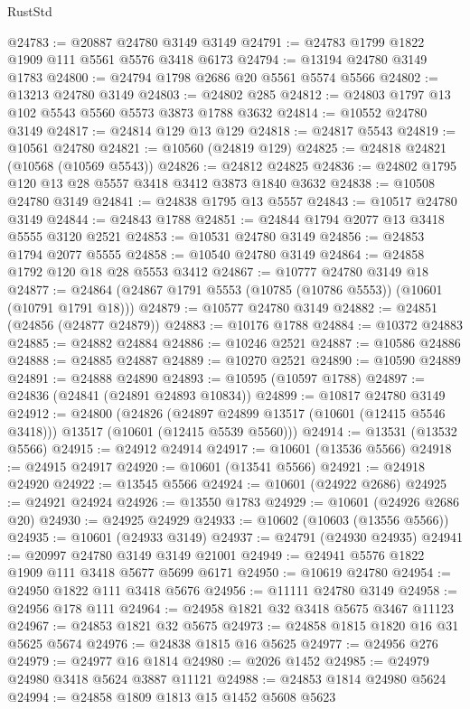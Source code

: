 \begin{lexlean}{RustStd}
\begin{coremodule}
@24783 := @20887 @24780 @3149 @3149
@24791 := @24783 @1799 @1822 @1909 @111 @5561 @5576 @3418 @6173
@24794 := @13194 @24780 @3149 @1783
@24800 := @24794 @1798 @2686 @20 @5561 @5574 @5566
@24802 := @13213 @24780 @3149
@24803 := @24802 @285
@24812 := @24803 @1797 @13 @102 @5543 @5560 @5573 @3873 @1788 @3632
@24814 := @10552 @24780 @3149
@24817 := @24814 @129 @13 @129
@24818 := @24817 @5543
@24819 := @10561 @24780
@24821 := @10560 (@24819 @129)
@24825 := @24818 @24821 (@10568 (@10569 @5543))
@24826 := @24812 @24825
@24836 := @24802 @1795 @120 @13 @28 @5557 @3418 @3412 @3873 @1840 @3632
@24838 := @10508 @24780 @3149
@24841 := @24838 @1795 @13 @5557
@24843 := @10517 @24780 @3149
@24844 := @24843 @1788
@24851 := @24844 @1794 @2077 @13 @3418 @5555 @3120 @2521
@24853 := @10531 @24780 @3149
@24856 := @24853 @1794 @2077 @5555
@24858 := @10540 @24780 @3149
@24864 := @24858 @1792 @120 @18 @28 @5553 @3412
@24867 := @10777 @24780 @3149 @18
@24877 := @24864 (@24867 @1791 @5553 (@10785 (@10786 @5553)) (@10601 (@10791 @1791 @18)))
@24879 := @10577 @24780 @3149
@24882 := @24851 (@24856 (@24877 @24879))
@24883 := @10176 @1788
@24884 := @10372 @24883
@24885 := @24882 @24884
@24886 := @10246 @2521
@24887 := @10586 @24886
@24888 := @24885 @24887
@24889 := @10270 @2521
@24890 := @10590 @24889
@24891 := @24888 @24890
@24893 := @10595 (@10597 @1788)
@24897 := @24836 (@24841 (@24891 @24893 @10834))
@24899 := @10817 @24780 @3149
@24912 := @24800
    (@24826
      (@24897 @24899 @13517 (@10601 (@12415 @5546 @3418)))
      @13517
      (@10601 (@12415 @5539 @5560)))
@24914 := @13531 (@13532 @5566)
@24915 := @24912 @24914
@24917 := @10601 (@13536 @5566)
@24918 := @24915 @24917
@24920 := @10601 (@13541 @5566)
@24921 := @24918 @24920
@24922 := @13545 @5566
@24924 := @10601 (@24922 @2686)
@24925 := @24921 @24924
@24926 := @13550 @1783
@24929 := @10601 (@24926 @2686 @20)
@24930 := @24925 @24929
@24933 := @10602 (@10603 (@13556 @5566))
@24935 := @10601 (@24933 @3149)
@24937 := @24791 (@24930 @24935)
@24941 := @20997 @24780 @3149 @3149 @21001
@24949 := @24941 @5576 @1822 @1909 @111 @3418 @5677 @5699 @6171
@24950 := @10619 @24780
@24954 := @24950 @1822 @111 @3418 @5676
@24956 := @11111 @24780 @3149
@24958 := @24956 @178 @111
@24964 := @24958 @1821 @32 @3418 @5675 @3467 @11123
@24967 := @24853 @1821 @32 @5675
@24973 := @24858 @1815 @1820 @16 @31 @5625 @5674
@24976 := @24838 @1815 @16 @5625
@24977 := @24956 @276
@24979 := @24977 @16 @1814
@24980 := @2026 @1452
@24985 := @24979 @24980 @3418 @5624 @3887 @11121
@24988 := @24853 @1814 @24980 @5624
@24994 := @24858 @1809 @1813 @15 @1452 @5608 @5623

\end{coremodule}
\end{lexlean}
